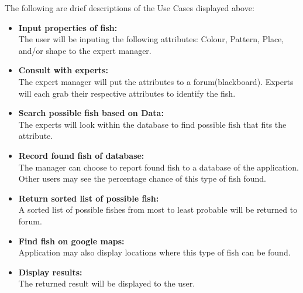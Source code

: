 \documentclass[]{article}
\begin{document}
\FloatBarrier

The following are drief descriptions of the Use Cases displayed above:
\begin{itemize}
\item \textbf{Input properties of fish:} \\
The user will be inputing the following attributes: Colour, Pattern, Place, and/or shape to the expert manager.
\item \textbf{Consult with experts:} \\
The expert manager will put the attributes to a forum(blackboard). Experts will each grab their respective attributes to identify the fish.
\item \textbf{Search possible fish based on Data:} \\
The experts will look within the database to find possible fish that fits the attribute.
\item \textbf{Record found fish of database:} \\
The manager can choose to report found fish to a database of the application. Other users may see the percentage chance of this type of fish found.
\item \textbf{Return sorted list of possible fish:} \\
A sorted list of possible fishes from most to least probable will be returned to forum.
\item \textbf{Find fish on google maps:} \\
Application may also display locations where this type of fish can be found.
\item \textbf{Display results:} \\
The returned result will be displayed to the user.
\end{itemize}
\end{document}
